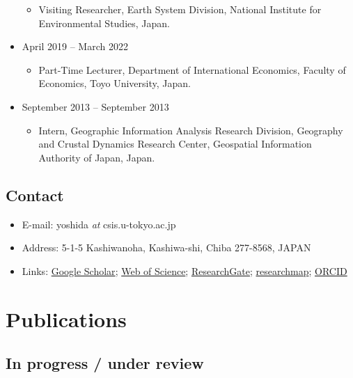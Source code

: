 \documentclass[
]{book}
\providecommand{\tightlist}{%
  \setlength{\itemsep}{0pt}\setlength{\parskip}{0pt}}
\begin{document}
\begin{itemize}
  \begin{itemize}
  \tightlist
  \item
    Visiting Researcher,
    Earth System Division, National Institute for Environmental Studies, Japan.
  \end{itemize}
\item
  April 2019 -- March 2022

  \begin{itemize}
  \tightlist
  \item
    Part-Time Lecturer,
    Department of International Economics, Faculty of Economics, Toyo University, Japan.
  \end{itemize}
\item
  September 2013 -- September 2013

  \begin{itemize}
  \tightlist
  \item
    Intern,
    Geographic Information Analysis Research Division, Geography and Crustal Dynamics Research Center, Geospatial Information Authority of Japan, Japan.
  \end{itemize}
\end{itemize}

\section*{Contact}\label{contact}

\begin{itemize}
\tightlist
\item
  E-mail: yoshida \emph{at} csis.u-tokyo.ac.jp
\item
  Address: 5-1-5 Kashiwanoha, Kashiwa-shi, Chiba 277-8568, JAPAN
\item
  Links: \href{https://scholar.google.co.jp/citations?user=bYbQYeUAAAAJ&hl=ja}{Google Scholar}; \href{https://www.webofscience.com/wos/author/record/847593}{Web of Science}; \href{https://www.researchgate.net/profile/Takahiro_Yoshida5}{ResearchGate}; \href{https://researchmap.jp/yoshida.takahiro}{researchmap}; \href{https://orcid.org/0000-0001-8741-5345}{ORCID}
\end{itemize}

\chapter*{Publications}\label{publications}

\section*{In progress / under review}\label{in-progress-under-review}
\end{document}
